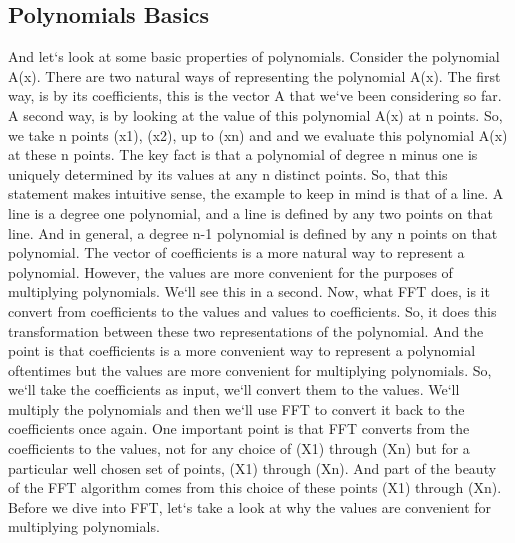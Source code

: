 \subsection{Polynomials Basics}
And let`s look at some basic properties of polynomials.
Consider the polynomial A(x).
There are two natural ways of representing the polynomial A(x).
The first way, is by its coefficients, this is the vector A that we`ve been considering so far.
A second way, is by looking at the value of this polynomial A(x) at n points.
So, we take n points (x1), (x2), up to (xn) and and we evaluate this polynomial A(x) at these n points.
The key fact is that a polynomial of degree n minus one is uniquely determined by its values at any n distinct points.
So, that this statement makes intuitive sense, the example to keep in mind is that of a line.
A line is a degree one polynomial, and a line is defined by any two points on that line.
And in general, a degree n-1 polynomial is defined by any n points on that polynomial.
The vector of coefficients is a more natural way to represent a polynomial.
However, the values are more convenient for the purposes of multiplying polynomials.
We`ll see this in a second.
Now, what FFT does, is it convert from coefficients to the values and values to coefficients.
So, it does this transformation between these two representations of the polynomial.
And the point is that coefficients is a more convenient way to represent a polynomial oftentimes but the values are more convenient for multiplying polynomials.
So, we`ll take the coefficients as input, we`ll convert them to the values.
We`ll multiply the polynomials and then we`ll use FFT to convert it back to the coefficients once again.
One important point is that FFT converts from the coefficients to the values, not for any choice of (X1) through (Xn) but for a particular well chosen set of points, (X1) through (Xn).
And part of the beauty of the FFT algorithm comes from this choice of these points (X1) through (Xn).
Before we dive into FFT, let`s take a look at why the values are convenient for multiplying polynomials.

